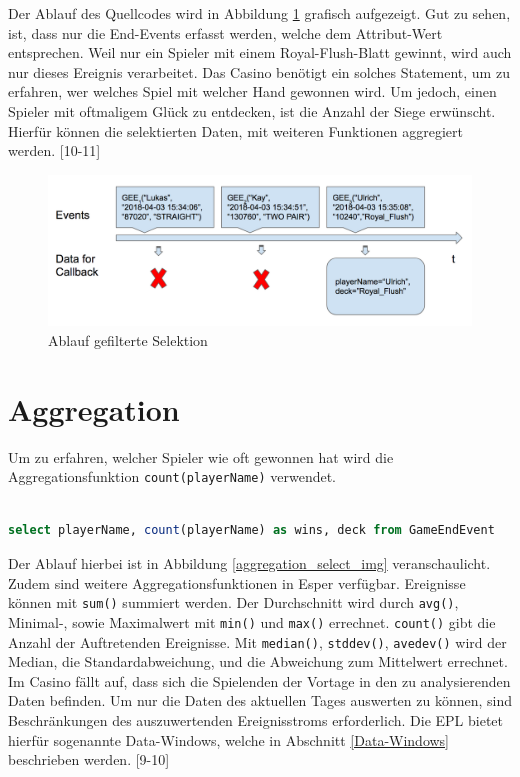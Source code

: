 Der Ablauf des Quellcodes wird in Abbildung \ref{filter_select_img} grafisch aufgezeigt. Gut zu sehen, ist, dass nur die End-Events erfasst werden, welche dem Attribut-Wert entsprechen. Weil nur ein Spieler mit einem Royal-Flush-Blatt gewinnt, wird auch nur dieses Ereignis verarbeitet.
Das Casino benötigt ein solches Statement, um zu erfahren, wer welches Spiel mit welcher Hand gewonnen wird. Um jedoch, einen Spieler mit oftmaligem Glück zu entdecken, ist die Anzahl der Siege erwünscht. Hierfür können die selektierten Daten, mit weiteren Funktionen aggregiert werden.
\cite{EsperRef2018}[10-11]

\begin{figure}[ht]
	\centering
	\includegraphics[width=\textwidth,height=\textheight, keepaspectratio]{images/statement_basic_filter.png}
	\caption{Ablauf gefilterte Selektion}
	\label{filter_select_img}
\end{figure}

\section{Aggregation}

Um zu erfahren, welcher Spieler wie oft gewonnen hat wird die Aggregationsfunktion \texttt{count(playerName)} verwendet.
\begin{lstlisting}[caption={Statement mit Aggregation},label=aggregation_select,captionpos=b,language=SQL]

select playerName, count(playerName) as wins, deck from GameEndEvent

\end{lstlisting}
Der Ablauf hierbei ist in Abbildung \ref{aggregation_select_img} veranschaulicht. 
Zudem sind weitere Aggregationsfunktionen in Esper verfügbar.
Ereignisse können mit \texttt{sum()} summiert werden. Der Durchschnitt wird durch \texttt{avg()}, Minimal-, sowie Maximalwert mit \texttt{min()} und \texttt{max()} errechnet. \texttt{count()} gibt die Anzahl der Auftretenden Ereignisse. Mit \texttt{median()}, \texttt{stddev()}, \texttt{avedev()} wird der Median, die Standardabweichung, und die Abweichung zum Mittelwert errechnet.
Im Casino fällt auf, dass sich die Spielenden der Vortage in den zu analysierenden Daten befinden. Um nur die Daten des aktuellen Tages auswerten zu können, sind Beschränkungen des auszuwertenden Ereignisstroms erforderlich. Die \acf{EPL} bietet hierfür sogenannte Data-Windows, welche in Abschnitt \ref{Data-Windows} beschrieben werden.
\cite{EsperRef2018}[9-10]

